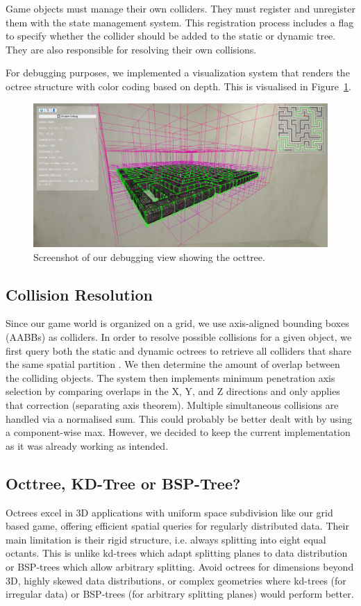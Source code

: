 \documentclass{article}
\begin{document}
Game objects must manage their own colliders. They must register
and unregister them with the state management system. This registration process
includes a flag to specify whether the collider should be added to the static
or dynamic tree. They are also responsible for resolving their own collisions.

For debugging purposes, we implemented a visualization system that renders the
octree structure with color coding based on depth.  This is visualised in
Figure~\ref{fig:octree}.

\begin{figure}[H]
    \centering
    \includegraphics[width=\textwidth]{diagrams/octree.png}
    \caption{Screenshot of our debugging view showing the octtree.}
    \label{fig:octree}
\end{figure}

\subsection{Collision Resolution}

Since our game world is organized on a grid, we use axis-aligned bounding boxes
(AABBs) as colliders. In order to resolve possible collisions for a given
object, we first query both the static and dynamic octrees to retrieve all
colliders that share the same spatial partition . We then determine the amount
of overlap between the colliding objects. The system then implements minimum
penetration axis selection by comparing overlaps in the X, Y, and Z directions
and only applies that correction (separating axis theorem). Multiple
simultaneous collisions are handled via a normalised sum. This could probably
be better dealt with by using a component-wise max. However, we decided to keep the
current implementation as it was already working as intended.

\subsection{Octtree, KD-Tree or BSP-Tree?}
Octrees excel in 3D applications with uniform space subdivision like our grid
based game, offering efficient spatial queries for regularly distributed data.
Their main limitation is their rigid structure, i.e. always splitting into eight
equal octants. This is unlike kd-trees which adapt splitting planes to data
distribution or BSP-trees which allow arbitrary splitting. Avoid octrees for
dimensions beyond 3D, highly skewed data distributions, or complex geometries
where kd-trees (for irregular data) or BSP-trees (for arbitrary splitting
planes) would perform better.
\end{document}
